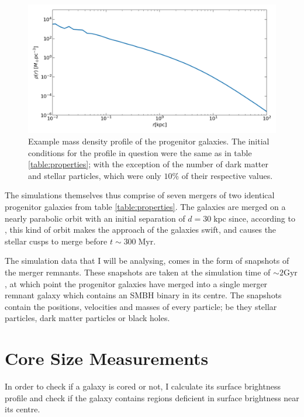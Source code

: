 \documentclass[english, oneside]{HYgradu}
\begin{document}
\begin{figure}
	\centering
	\includegraphics[width=\textwidth]{IC.png}
	\caption{Example mass density profile of the progenitor galaxies. The initial conditions for the profile in question were the same as in table \ref{table:properties}; with the exception of the number of dark matter and stellar particles, which were only $10\%$ of their respective values.}
	\label{figure:IC_density_profile}
\end{figure}

The simulations themselves thus comprise of seven mergers of two identical progenitor galaxies from table \ref{table:properties}. The galaxies are merged on a nearly parabolic orbit with an initial separation of $d = 30 \; \mathrm{kpc}$ since, according to \cite{Rantala2018}, this kind of orbit makes the approach of the galaxies swift, and causes the stellar cusps to merge before $t \sim 300 \; \mathrm{Myr}$.

The simulation data that I will be analysing, comes in the form of snapshots of the merger remnants. These snapshots are taken at the simulation time of $\sim 2 \mathrm{Gyr}$, at which point the progenitor galaxies have merged into a single merger remnant galaxy which contains an SMBH binary in its centre. The snapshots contain the positions, velocities and masses of every particle; be they stellar particles, dark matter particles or black holes.

\section{Core Size Measurements}

In order to check if a galaxy is cored or not, I calculate its surface brightness profile and check if the galaxy contains regions deficient in surface brightness near its centre.
\end{document}
